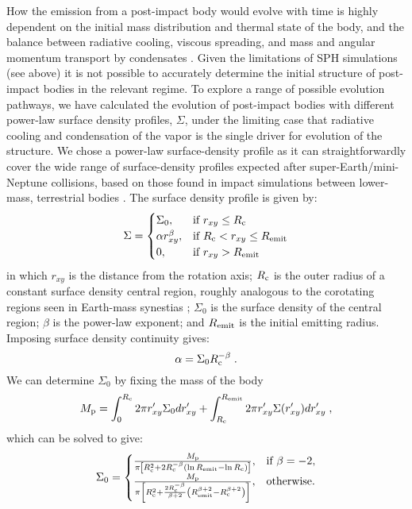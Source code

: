 \documentclass[sn-nature,oneside]{sn-jnl}%
\begin{document}
How the emission from a post-impact body would evolve with time is highly dependent on the initial mass distribution and thermal state of the body, and the balance between radiative cooling, viscous spreading, and mass and angular momentum transport by condensates \cite{Lock2017,Lock18,Lock2020}. 
%
Given the limitations of SPH simulations (see above) it is not possible to accurately determine the initial structure of post-impact bodies in the relevant regime.
%
To explore a range of possible evolution pathways, we have calculated the evolution of post-impact bodies with different power-law surface density profiles, $\Sigma$, under the limiting case that radiative cooling and condensation of the vapor is the single driver for evolution of the structure. 
%
We chose a power-law surface-density profile as it can straightforwardly cover the wide range of surface-density profiles expected after super-Earth/mini-Neptune collisions, based on those found in impact simulations between lower-mass, terrestrial bodies \cite{Lock2017,Canup2001,Canup2012,Cuk2012,Rufu2017,Reufer2012}. 
%
The surface density profile is given by:
%
\begin{equation}
\Sigma=\begin{cases}
\Sigma_0, & \text{if } r_{xy}\leq R_{\rm c}\\
\alpha r_{xy}^{\beta}, & \text{if } R_{\rm c} < r_{xy}\leq R_{\rm emit}\\
0, & \text{if } r_{xy}> R_{\rm emit}
\end{cases}   
\label{eqn:sigma}
\end{equation}
%
in which $r_{xy}$ is the distance from the rotation axis; $R_{\rm c}$ is the outer radius of a constant surface density central region, roughly analogous to the corotating regions seen in Earth-mass synestias \cite{Lock2017,Lock18}; $\Sigma_0$ is the surface density of the central region; $\beta$ is the power-law exponent; and $R_{\rm emit}$ is the initial emitting radius. Imposing surface density continuity gives:
%
\begin{equation}
    \alpha=\Sigma_0 R_{\rm c}^{-\beta} \; .
\end{equation}
%
We can determine $\Sigma_0$ by fixing the mass of the body
%
\begin{equation}
    M_{\rm p} = \int_0^{R_{\rm c}}{2 \pi r'_{xy} \Sigma_0 dr'_{xy}} + \int_{R_{\rm c}}^{R_{\rm emit}}{2 \pi r'_{xy} \Sigma(r'_{xy}) dr'_{xy}} \; ,
\end{equation}
%
which can be solved to give:
%
\begin{equation}
\Sigma_0=\begin{cases}
\frac{M_{\rm p}}{\pi \left [R_{\rm c}^2 + 2 R_{\rm c}^{-\beta} \left ( \ln{R_{\rm emit}}-\ln{R_{\rm c}}\right ) \right ]}, & \text{if } \beta=-2,\\
\frac{M_{\rm p}}{\pi \left [R_{\rm c}^2 + \frac{2 R_{\rm c}^{-\beta}}{\beta+2} \left ( R_{\rm emit}^{\beta+2}-R_{\rm c}^{\beta+2}\right ) \right ]}, & \text{otherwise.} 
\end{cases}
\end{equation}
\end{document}
